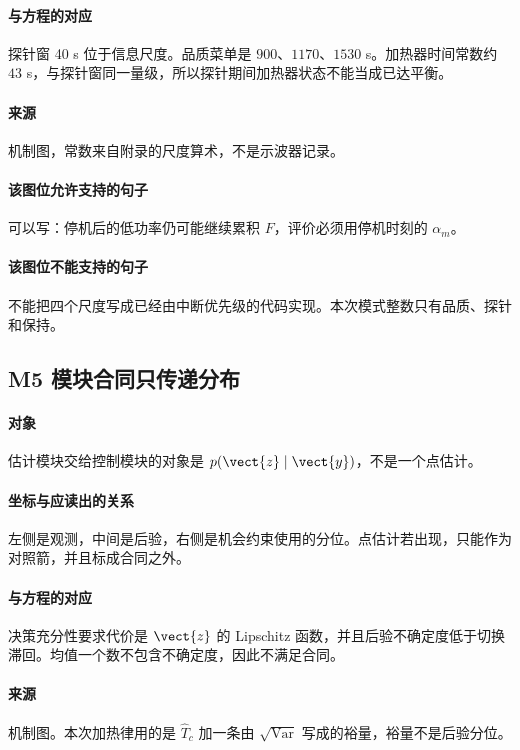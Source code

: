 \paragraph{与方程的对应}
探针窗 40 s 位于信息尺度。品质菜单是 $900$、$1170$、$1530$ s。加热器时间常数约 $43$ s，与探针窗同一量级，所以探针期间加热器状态不能当成已达平衡。

\paragraph{来源}
机制图，常数来自附录的尺度算术，不是示波器记录。

\paragraph{该图位允许支持的句子}
可以写：停机后的低功率仍可能继续累积 $F$，评价必须用停机时刻的 $\alpha_m$。

\paragraph{该图位不能支持的句子}
不能把四个尺度写成已经由中断优先级的代码实现。本次模式整数只有品质、探针和保持。

\subsection{M5 模块合同只传递分布}
\paragraph{对象}
估计模块交给控制模块的对象是 $p(\vect{z}\mid\vect{y})$，不是一个点估计。

\paragraph{坐标与应读出的关系}
左侧是观测，中间是后验，右侧是机会约束使用的分位。点估计若出现，只能作为对照箭，并且标成合同之外。

\paragraph{与方程的对应}
决策充分性要求代价是 $\vect{z}$ 的 Lipschitz 函数，并且后验不确定度低于切换滞回。均值一个数不包含不确定度，因此不满足合同。

\paragraph{来源}
机制图。本次加热律用的是 $\hat T_c$ 加一条由 $\sqrt{\mathrm{Var}}$ 写成的裕量，裕量不是后验分位。

